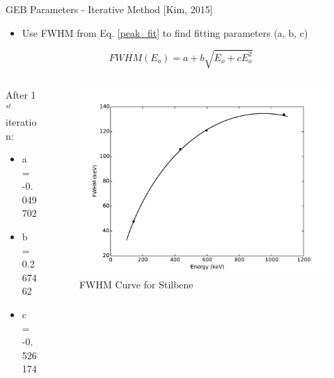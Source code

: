 \documentclass{beamer}
\begin{document}
\begin{frame}{GEB Parameters - Iterative Method [Kim, 2015]}
  \begin{itemize}
  \item Use FWHM from Eq. \ref{peak_fit} to find fitting parameters (a, b, c)
  \end{itemize}
  \begin{equation} \label{FWHM}
  FWHM(E_o) = a + b \sqrt{E_o + c E_o^2}
  \end{equation}
\vspace{-0.5cm}
  \begin{columns}
    \begin{column}{0.3\textwidth}
      \begin{block}{After 1$^{st}$ iteration:}
      \begin{itemize}
      \item a = -0.049702
      \item b =  0.267462
      \item c = -0.526174
      \end{itemize}
      \end{block}
	\end{column}
	\begin{column}{0.5\textwidth}
      \begin{figure}
      \begin{center}
      \vspace{-0.5cm}
      \includegraphics[scale=0.3]{FWHM_values1}
      \vspace{-0.5cm}
      \caption{\scriptsize{FWHM Curve for Stilbene}}
      \end{center}
      \end{figure}
	\end{column}
  \end{columns}
\end{frame}
\end{document}
